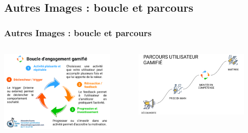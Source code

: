 \documentclass[slidetop,11pt]{beamer}
\begin{document}
\subsection{Autres Images : boucle et parcours}
\begin{frame}
	\frametitle{Autres Images : boucle et parcours}
	
	\begin{columns}[T]
	\begin{column}[T]{6cm}
		\includegraphics[width=5.5cm]{img/boucle-engagement-gamifie.png}~\\
	\end{column}
	\begin{column}[T]{6cm}
		\includegraphics[width=5.5cm]{img/parcours-utilisateur-gamifie.png}~\\
	\end{column}
	\end{columns}

\end{frame}
\end{document}
